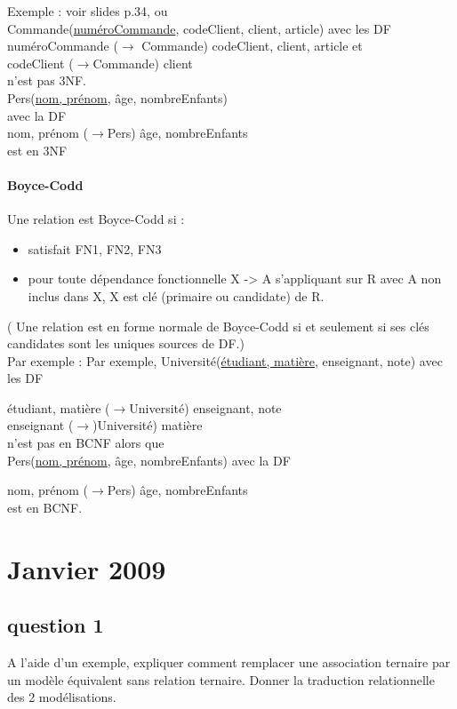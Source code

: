 Exemple : voir slides p.34, ou\\
Commande(\underline{numéroCommande}, codeClient, client, article) avec les DF\\
numéroCommande ($\rightarrow$ Commande) codeClient, client, article et\\
codeClient ($\rightarrow$Commande) client \\
n'est pas 3NF.\\

Pers(\underline{nom, prénom}, âge, nombreEnfants)\\
avec la DF\\
nom, prénom ($\rightarrow$Pers) âge, nombreEnfants\\
est en 3NF


\paragraph{Boyce-Codd}
Une relation est Boyce-Codd si :
\begin{itemize}
	\item satisfait FN1, FN2, FN3
	\item pour toute dépendance fonctionnelle X -> A s'appliquant sur R avec A non inclus dans X, X est clé (primaire ou candidate) de R.
\end{itemize}
( Une relation est en forme normale de Boyce-Codd si et seulement si ses clés candidates sont les uniques sources de DF.)\\

Par exemple : 
Par exemple, Université(\underline{étudiant, matière}, enseignant, note) avec les DF

étudiant, matière ($\rightarrow$Université) enseignant, note \\
enseignant ($\rightarrow$)Université) matière\\
n'est pas en BCNF alors que \\

Pers(\underline{nom, prénom}, âge, nombreEnfants) avec la DF

nom, prénom ($\rightarrow$Pers) âge, nombreEnfants\\
est en BCNF.\\

\section{Janvier 2009}

\subsection{question 1}
A l’aide d’un exemple, expliquer comment remplacer une association ternaire par un modèle
équivalent sans relation ternaire. Donner la traduction relationnelle des 2 modélisations.

